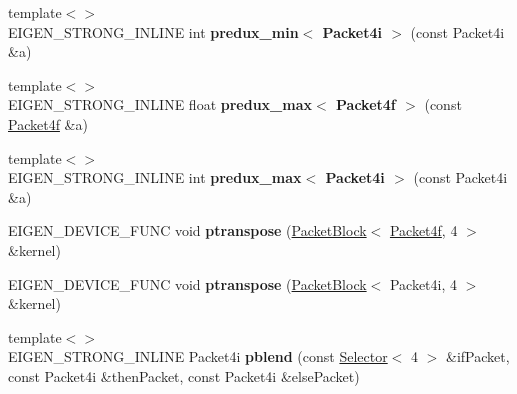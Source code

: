 \begin{DoxyCompactItemize}
\item 
\mbox{\label{namespace_eigen_1_1internal_a547129a430eecaa551362390df1de9e8}} 
{\footnotesize template$<$$>$ }\\E\+I\+G\+E\+N\+\_\+\+S\+T\+R\+O\+N\+G\+\_\+\+I\+N\+L\+I\+NE int {\bfseries predux\+\_\+min$<$ Packet4i $>$} (const Packet4i \&a)
\item 
\mbox{\label{namespace_eigen_1_1internal_a3f362a568c10197e5cd626364b40c3f8}} 
{\footnotesize template$<$$>$ }\\E\+I\+G\+E\+N\+\_\+\+S\+T\+R\+O\+N\+G\+\_\+\+I\+N\+L\+I\+NE float {\bfseries predux\+\_\+max$<$ Packet4f $>$} (const \hyperlink{struct_eigen_1_1internal_1_1_packet4f}{Packet4f} \&a)
\item 
\mbox{\label{namespace_eigen_1_1internal_ad28bd4ccd47c402564a0db725615a2cc}} 
{\footnotesize template$<$$>$ }\\E\+I\+G\+E\+N\+\_\+\+S\+T\+R\+O\+N\+G\+\_\+\+I\+N\+L\+I\+NE int {\bfseries predux\+\_\+max$<$ Packet4i $>$} (const Packet4i \&a)
\item 
\mbox{\label{namespace_eigen_1_1internal_afbdf533875143a3098fc4e9f09ffabde}} 
E\+I\+G\+E\+N\+\_\+\+D\+E\+V\+I\+C\+E\+\_\+\+F\+U\+NC void {\bfseries ptranspose} (\hyperlink{struct_eigen_1_1internal_1_1_packet_block}{Packet\+Block}$<$ \hyperlink{struct_eigen_1_1internal_1_1_packet4f}{Packet4f}, 4 $>$ \&kernel)
\item 
\mbox{\label{namespace_eigen_1_1internal_acbbc6edd7b5a3c83be4c59291e84595a}} 
E\+I\+G\+E\+N\+\_\+\+D\+E\+V\+I\+C\+E\+\_\+\+F\+U\+NC void {\bfseries ptranspose} (\hyperlink{struct_eigen_1_1internal_1_1_packet_block}{Packet\+Block}$<$ Packet4i, 4 $>$ \&kernel)
\item 
\mbox{\label{namespace_eigen_1_1internal_a5b61c32bd045683391e8cff756fd0be2}} 
{\footnotesize template$<$$>$ }\\E\+I\+G\+E\+N\+\_\+\+S\+T\+R\+O\+N\+G\+\_\+\+I\+N\+L\+I\+NE Packet4i {\bfseries pblend} (const \hyperlink{struct_eigen_1_1internal_1_1_selector}{Selector}$<$ 4 $>$ \&if\+Packet, const Packet4i \&then\+Packet, const Packet4i \&else\+Packet)
\item 

\end{DoxyCompactItemize}
